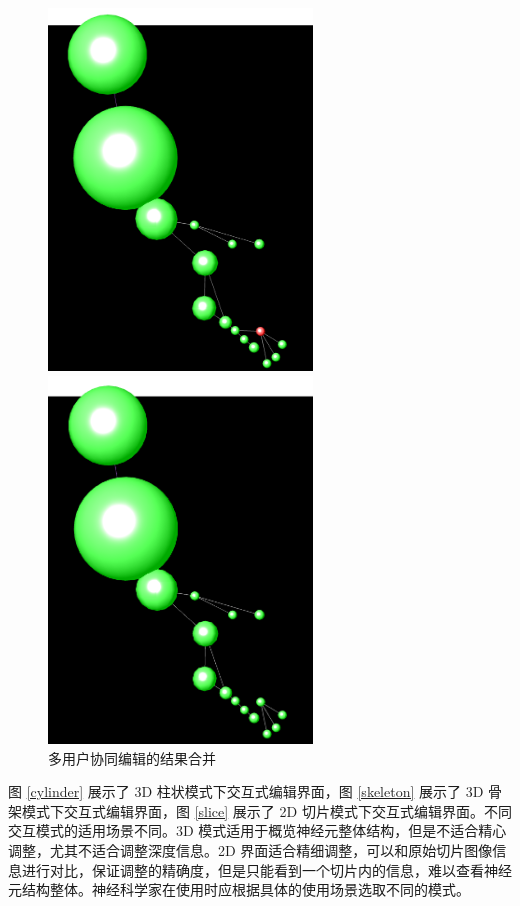 \begin{figure}[!ht]
\begin{minipage}[t]{0.5\linewidth}
\end{minipage}   
\begin{minipage}[t]{0.5\linewidth}
    \centering  
    \includegraphics[width=7cm]{images/a3}   
\end{minipage}   
\begin{minipage}[t]{0.5\linewidth}
    \centering  
    \includegraphics[width=7cm]{images/a4}   
\end{minipage} 
\caption{多用户协同编辑的结果合并}
\label{merge}     
\end{figure}

图 \ref{cylinder} 展示了 3D 柱状模式下交互式编辑界面，图 \ref{skeleton} 展示了 3D 骨架模式下交互式编辑界面，图 \ref{slice} 展示了 2D 切片模式下交互式编辑界面。不同交互模式的适用场景不同。3D 模式适用于概览神经元整体结构，但是不适合精心调整，尤其不适合调整深度信息。2D 界面适合精细调整，可以和原始切片图像信息进行对比，保证调整的精确度，但是只能看到一个切片内的信息，难以查看神经元结构整体。神经科学家在使用时应根据具体的使用场景选取不同的模式。

